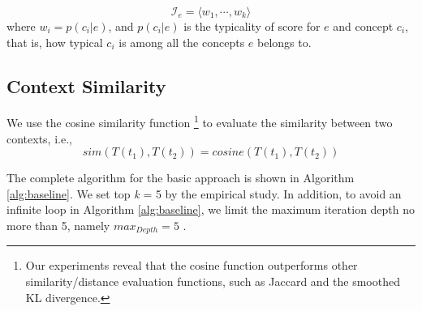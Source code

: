 \begin{equation}
\label{eq:Ie}
  \mathcal{I}_e = \langle w_1,\cdots,w_k\rangle
\end{equation}
where $w_i=p(c_i|e)$, and $p(c_i|e)$ is the
typicality of score for $e$ and concept $c_i$, that is, how typical
$c_i$ is among all the concepts $e$ belongs to.




\subsection{Context Similarity}
We use the cosine similarity function
\footnote{Our experiments reveal that
the cosine function outperforms
other similarity/distance evaluation functions, such as Jaccard and the smoothed KL divergence.}
to evaluate the similarity between two contexts, i.e.,
\begin{equation}
sim(T(t_{1}), T(t_{2})) = cosine(T(t_{1}), T(t_{2}))
\label{eq:cosine}
\end{equation}

The complete algorithm for the basic approach is shown
in Algorithm \ref{alg:baseline}.
We set top \emph{k} = 5 by the empirical study. In addition, to avoid an infinite loop in Algorithm \ref{alg:baseline}, we limit the maximum iteration depth no more than 5, namely $max_{Depth} = 5$ .

